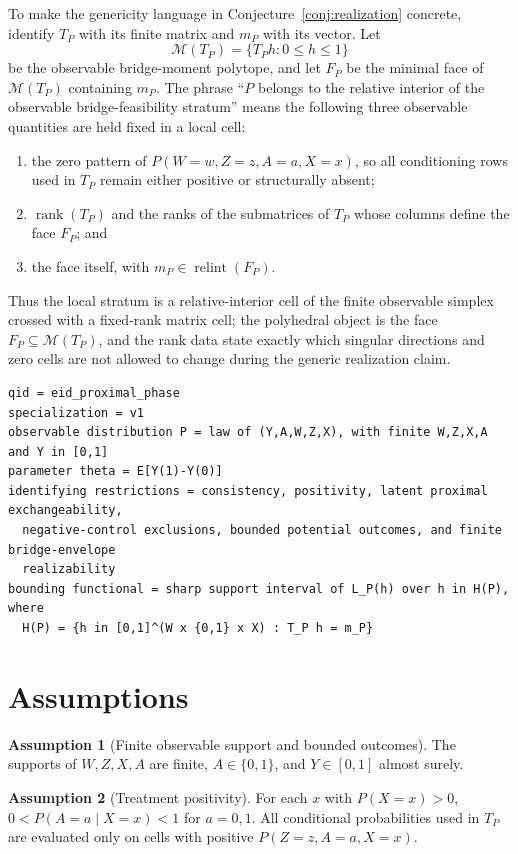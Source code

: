 \documentclass[11pt]{article}
\theoremstyle{definition}
\newtheorem{assumption}{Assumption}
\theoremstyle{plain}
\theoremstyle{remark}
\begin{document}
To make the genericity language in Conjecture~\ref{conj:realization}
concrete, identify \(T_P\) with its finite matrix and \(m_P\) with its vector.
Let
\[
\mathcal M(T_P)=\{T_Ph:0\le h\le1\}
\]
be the observable bridge-moment polytope, and let \(F_P\) be the minimal face
of \(\mathcal M(T_P)\) containing \(m_P\).  The phrase ``\(P\) belongs to the
relative interior of the observable bridge-feasibility stratum'' means the
following three observable quantities are held fixed in a local cell:
\begin{enumerate}[label=(\alph*)]
\item the zero pattern of \(P(W=w,Z=z,A=a,X=x)\), so all conditioning rows used
in \(T_P\) remain either positive or structurally absent;
\item \(\operatorname{rank}(T_P)\) and the ranks of the submatrices of \(T_P\)
whose columns define the face \(F_P\); and
\item the face itself, with \(m_P\in\operatorname{relint}(F_P)\).
\end{enumerate}
Thus the local stratum is a relative-interior cell of the finite observable
simplex crossed with a fixed-rank matrix cell; the polyhedral object is the
face \(F_P\subseteq\mathcal M(T_P)\), and the rank data state exactly which
singular directions and zero cells are not allowed to change during the
generic realization claim.

\begin{verbatim}
qid = eid_proximal_phase
specialization = v1
observable distribution P = law of (Y,A,W,Z,X), with finite W,Z,X,A and Y in [0,1]
parameter theta = E[Y(1)-Y(0)]
identifying restrictions = consistency, positivity, latent proximal exchangeability,
  negative-control exclusions, bounded potential outcomes, and finite bridge-envelope
  realizability
bounding functional = sharp support interval of L_P(h) over h in H(P), where
  H(P) = {h in [0,1]^(W x {0,1} x X) : T_P h = m_P}
\end{verbatim}

\section{Assumptions}
\begin{assumption}[Finite observable support and bounded outcomes]\label{ass:finite-bounded}
The supports of \(W,Z,X,A\) are finite, \(A\in\{0,1\}\), and \(Y\in[0,1]\)
almost surely.
\end{assumption}

\begin{assumption}[Treatment positivity]\label{ass:positivity}
For each \(x\) with \(P(X=x)>0\), \(0<P(A=a\mid X=x)<1\) for \(a=0,1\).
All conditional probabilities used in \(T_P\) are evaluated only on cells with
positive \(P(Z=z,A=a,X=x)\).
\end{assumption}
\end{document}
